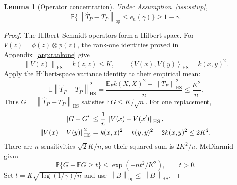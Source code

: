 \documentclass[11pt,a4paper]{article}
\newtheorem{lemma}[theorem]{Lemma}
\theoremstyle{definition}
\theoremstyle{remark}
\newcommand{\E}{\mathbb E}
\newcommand{\Prob}{\mathbb P}
\newcommand{\norm}[1]{\left\lVert#1\right\rVert}
\newcommand{\inner}[2]{\left\langle#1,#2\right\rangle}
\newcommand{\op}{\mathrm{op}}
\newcommand{\HS}{\mathrm{HS}}
\begin{document}
\begin{lemma}[Operator concentration]\label{lem:operator}
Under Assumption~\ref{ass:setup},
\begin{equation}\label{eq:op-event}
 \Prob\{\norm{\widehat T_P-T_P}_{\op}
            \le e_n(\gamma)\}\ge1-\gamma.
\end{equation}
\end{lemma}
\begin{proof}
The Hilbert--Schmidt operators form a Hilbert space.
For $V(z)=\phi(z)\otimes\phi(z)$, the rank-one identities proved in
Appendix~\ref{app:rankone} give
\begin{equation}\label{eq:Vnorm}
 \norm{V(z)}_{\HS}=k(z,z)\le K,\qquad
 \inner{V(x)}{V(y)}_{\HS}=k(x,y)^2.
\end{equation}
Apply the Hilbert-space variance identity to their empirical mean:
\begin{equation}\label{eq:operator-variance}
 \E\norm{\widehat T_P-T_P}_{\HS}^2
 =\frac{\E_P k(X,X)^2-\norm{T_P}_{\HS}^2}{n}
 \le\frac{K^2}{n}.
\end{equation}
Thus $G=\norm{\widehat T_P-T_P}_{\HS}$ satisfies $\E G\le K/\sqrt n$.
For one replacement,
\begin{align}
 |G-G'|&\le\frac1n\norm{V(x)-V(x')}_{\HS},\notag\\
 \norm{V(x)-V(y)}_{\HS}^2
 &=k(x,x)^2+k(y,y)^2-2k(x,y)^2\le2K^2.
 \label{eq:Vdiameter}
\end{align}
There are $n$ sensitivities $\sqrt2K/n$, so their squared sum is
$2K^2/n$. McDiarmid gives
\begin{equation}\label{eq:op-tail}
 \Prob\{G-\E G\ge t\}\le\exp(-nt^2/K^2),\qquad t>0.
\end{equation}
Set $t=K\sqrt{\log(1/\gamma)/n}$ and use
$\norm{B}_{\op}\le\norm{B}_{\HS}$.
\end{proof}
\end{document}
